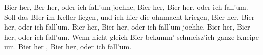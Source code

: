 \beginverse*
Bier her, Ber her, 
oder ich fall’um jochhe,
Bier her, Bier her,
oder ich fall’um.
Soll das BIer im Keller liegen,
und ich hier die ohnmacht kriegen,
Bier her, Bier her,
oder ich fall’um.
\endverse
\beginverse*
Bier her, Bier her,
oder ich fall’um jochhe,
Bier her, Bier her,
oder ich fall’um.
Wenn nicht gleich Bier bekumm’
schmeisz’ich ganze Kneipe um.
Bier her , Bier her,
oder ich fall’um.
\endverse
\endsong